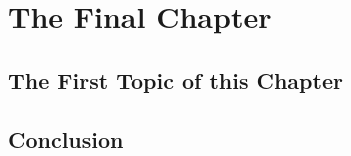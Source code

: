 \chapter{The Final Chapter}
\label{cha:n}

\section{The First Topic of this Chapter}

\section{Conclusion}

